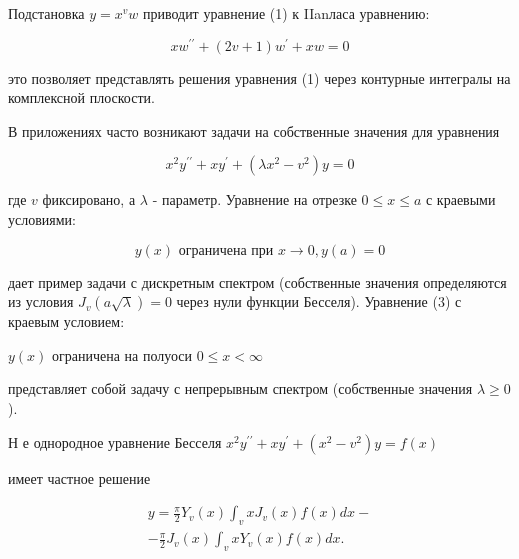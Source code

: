 \documentclass[10pt]{article}
\begin{document}
Подстановка $y=x^{v} w$ приводит уравнение (1) к IIanласа уравнению:



\[

x w^{\prime \prime}+(2 v+1) w^{\prime}+x w=0

\]



это позволяет представлять решения уравнения (1) через контурные интегралы на комплексной плоскости.



В приложениях часто возникают задачи на собственные значения для уравнения



\[

x^{2} y^{\prime \prime}+x y^{\prime}+\left(\lambda x^{2}-v^{2}\right) y=0

\]



где $v$ фиксировано, а $\lambda$ - параметр. Уравнение на отрезке $0 \leqslant x \leqslant a$ с краевыми условиями:



\[

y(x) \text { ограничена при } x \rightarrow 0, y(a)=0

\]



дает пример задачи с дискретным спектром (собственные значения определяются из условия $J_{v}(a \sqrt{\lambda})=0$ через нули функции Бесселя). Уравнение (3) с краевым условием:



$y(x)$ ограничена на полуоси $0 \leqslant x<\infty$



представляет собой задачу с непрерывным спектром (собственные значения $\lambda \geqslant 0$ ).



Н е однородное уравнение Бесселя $x^{2} y^{\prime \prime}+x y^{\prime}+\left(x^{2}-v^{2}\right) y=f(x)$



имеет частное решение



\[

\begin{gathered}

y=\frac{\pi}{2} Y_{v}(x) \int_{v} x J_{v}(x) f(x) d x- \\

-\frac{\pi}{2} J_{v}(x) \int_{v} x Y_{v}(x) f(x) d x .

\end{gathered}

\]
\end{document}
